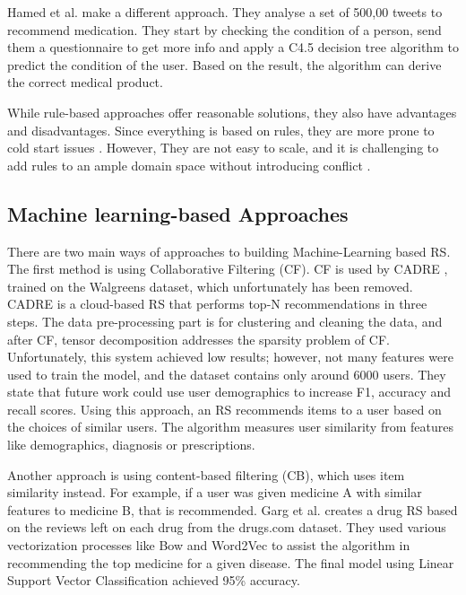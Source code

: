 Hamed et al. \cite{Hamed2012} make a different approach. They analyse a set of
500,00 tweets to recommend medication. They start by checking the condition of
a person, send them a questionnaire to get more info and apply a C4.5 decision
tree algorithm to predict the condition of the user. Based on the result, the
algorithm can derive the correct medical product. 

While rule-based approaches offer reasonable solutions, they also have
advantages and disadvantages. Since everything is based on rules, they are
more prone to cold start issues \cite{PradeepKumarSingh2021}. However, They are
not easy to scale, and it is challenging to add rules to an ample domain space
without introducing conflict \cite{Bhoi2021}.

\subsection{
Machine learning-based Approaches
}


There are two main ways of approaches to building
Machine-Learning based RS. The first method is using
Collaborative Filtering (CF). CF is used by CADRE
\cite{Zhang2015}, trained on the Walgreens dataset, which
unfortunately has been removed. CADRE is a cloud-based RS
that performs top-N recommendations in three steps. The
data pre-processing part is for clustering and cleaning
the data, and after CF, tensor decomposition addresses
the sparsity problem of CF. Unfortunately, this system
achieved low results; however, not many features were
used to train the model, and the dataset contains only
around 6000 users. They state that future work could use
user demographics to increase F1, accuracy and recall
scores. Using this approach, an RS recommends items to a
user based on the choices of similar users. The algorithm
measures user similarity from features like demographics,
diagnosis or prescriptions. 

Another approach is using content-based filtering (CB),
which uses item similarity instead. For example, if a
user was given medicine A with similar features to
medicine B, that is recommended. Garg et al. \cite{Garg}
creates a drug RS based on the reviews left on each drug
from the drugs.com dataset. They used various
vectorization processes like Bow and Word2Vec to assist
the algorithm in recommending the top medicine for a
given disease. The final model using Linear Support
Vector Classification achieved 95\% accuracy.



